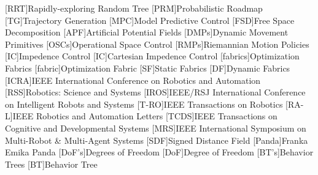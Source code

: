 [RRT]{Rapidly-exploring Random Tree}
[PRM]{Probabilistic Roadmap}
[TG]{Trajectory Generation}
[MPC]{Model Predictive Control}
[FSD]{Free Space Decomposition}
[APF]{Artificial Potential Fields}
[DMPs]{Dynamic Movement Primitives}
[OSCs]{Operational Space Control}
[RMPs]{Riemannian Motion Policies}
[IC]{Impedence Control}
[IC]{Cartesian Impedence Control}
[fabrics]{Optimization Fabrics}
[fabric]{Optimization Fabric}
[SF]{Static Fabrics}
[DF]{Dynamic Fabrics}
[ICRA]{IEEE International Conference on Robotics and Automation}
[RSS]{Robotics: Science and Systems}
[IROS]{IEEE/RSJ International Conference on Intelligent Robots and Systems}
[T-RO]{IEEE Transactions on Robotics}
[RA-L]{IEEE Robotics and Automation Letters}
[TCDS]{IEEE Transactions on Cognitive and Developmental Systems}
[MRS]{IEEE International Symposium on Multi-Robot \& Multi-Agent Systems}
[SDF]{Signed Distance Field}
[Panda]{Franka Emika Panda}
[DoF's]{Degrees of Freedom}
[DoF]{Degree of Freedom}
[BT's]{Behavior Trees}
[BT]{Behavior Tree}


\newcommand{\tn}[1]{\textnormal{#1}}
\newcommand{\tb}[1]{\textbf{#1}}
\newcommand{\ti}[1]{\textit{#1}}
\newcommand{\va}{\mathbf{a}}
\newcommand{\vb}{\mathbf{b}}
\newcommand{\vc}{\mathbf{c}}
\newcommand{\vd}{\mathbf{d}}
\newcommand{\ve}{\mathbf{e}}
\newcommand{\vf}{\mathbf{f}}
\newcommand{\vg}{\mathbf{g}}
\newcommand{\vh}{\mathbf{h}}
\newcommand{\vl}{\mathbf{l}}
\newcommand{\vm}{\mathbf{m}}
\newcommand{\vn}{\mathbf{n}}
\newcommand{\vp}{\mathbf{p}}
\newcommand{\vq}{\mathbf{q}}
\newcommand{\vr}{\mathbf{r}}
\newcommand{\vs}{\mathbf{s}}
\newcommand{\vS}{\mathbf{S}}
\newcommand{\vo}{\mathbf{o}}
\newcommand{\vt}{\mathbf{t}}
\newcommand{\vu}{\mathbf{u}}
\newcommand{\vv}{\mathbf{v}}
\newcommand{\vw}{\mathbf{w}}
\newcommand{\vx}{\mathbf{x}}
\newcommand{\vX}{\mathbf{X}}
\newcommand{\vy}{\mathbf{y}}
\newcommand{\vz}{\mathbf{z}}
\newcommand{\cA}{\mathcal{A}}
\newcommand{\cB}{\mathcal{B}}
\newcommand{\cC}{\mathcal{C}}
\newcommand{\cD}{\mathcal{D}}
\newcommand{\cE}{\mathcal{E}}
\newcommand{\cF}{\mathcal{F}}
\newcommand{\cG}{\mathcal{G}}
\newcommand{\cH}{\mathcal{H}}
\newcommand{\cI}{\mathcal{I}}
\newcommand{\cJ}{\mathcal{J}}
\newcommand{\cK}{\mathcal{K}}
\newcommand{\cL}{\mathcal{L}}
\newcommand{\cM}{\mathcal{M}}
\newcommand{\cN}{\mathcal{N}}
\newcommand{\cO}{\mathcal{O}}
\newcommand{\cP}{\mathcal{P}}
\newcommand{\cQ}{\mathcal{Q}}
\newcommand{\cR}{\mathcal{R}}
\newcommand{\cS}{\mathcal{S}}
\newcommand{\cT}{\mathcal{T}}
\newcommand{\cU}{\mathcal{U}}
\newcommand{\cV}{\mathcal{V}}
\newcommand{\cW}{\mathcal{W}}
\newcommand{\cX}{\mathcal{X}}
\newcommand{\cY}{\mathcal{Y}}
\newcommand{\cZ}{\mathcal{Z}}

